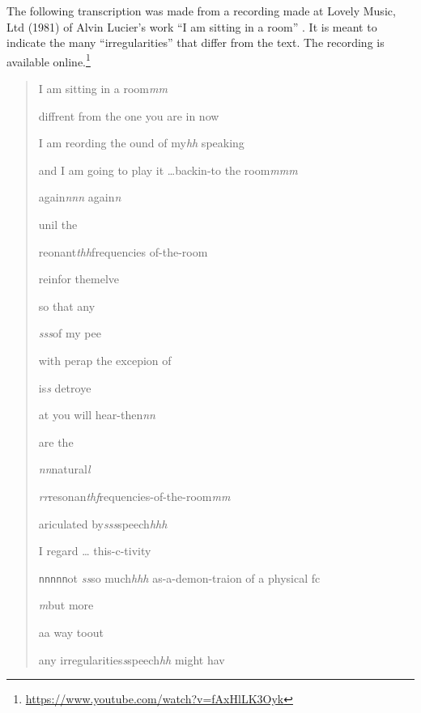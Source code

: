 The following transcription was made from a recording made at Lovely Music, Ltd (1981) of Alvin Lucier's work ``I am sitting in a room'' \parencite{Luc70:Iam}. It is meant to indicate the many ``irregularities'' that differ from the text. The recording is available online.\footnote{\url{https://www.youtube.com/watch?v=fAxHlLK3Oyk}} 
\begin{quote}
\small
I am sitting in a room\textit{mm}\par
diffrent from the one you are in now\par
{}
I am reording the ound of my\textit{hh} speaking  \par
{}
and I am going to play it \dots backin-to the room\textit{mmm} \par
again\textit{nnn}   again\textit{n} \par
{}
unil the\par
reonant\textit{thh\rightarrowff}frequencies of-the-room\par
{}
reinfor themelve\par
{}
so that any \par
\textit{{\small s}ss}\rightarrowemblance of my pee\par
{}
with perap the excepion of\par
{}\par
is\textit{s} detroye\par
\par\par
{}at you will hear-then\textit{nn} \par
{}
are the\par
\quad \textit{nn}natural\textit{l}\par
\quad \quad \textit{rr}resonan\textit{thf\rightarrowff}requencies-of-the-room\textit{mm}\par
ariculated by\textit{sss}speech\textit{hhh} \par
I regard \dots{} this-c-tivity\par
{}
\texttt{nnnnn\rightarrow}ot \textit{ss}so much\textit{hhh} as-a-demon-traion of a physical fc\par
{}
\textit{m}but more\par
{}
aa way {} to\rightarrow{}\normal out \par
any irregularities\rightarrowmy \textit{s}speech\textit{hh} might hav
\end{quote}
